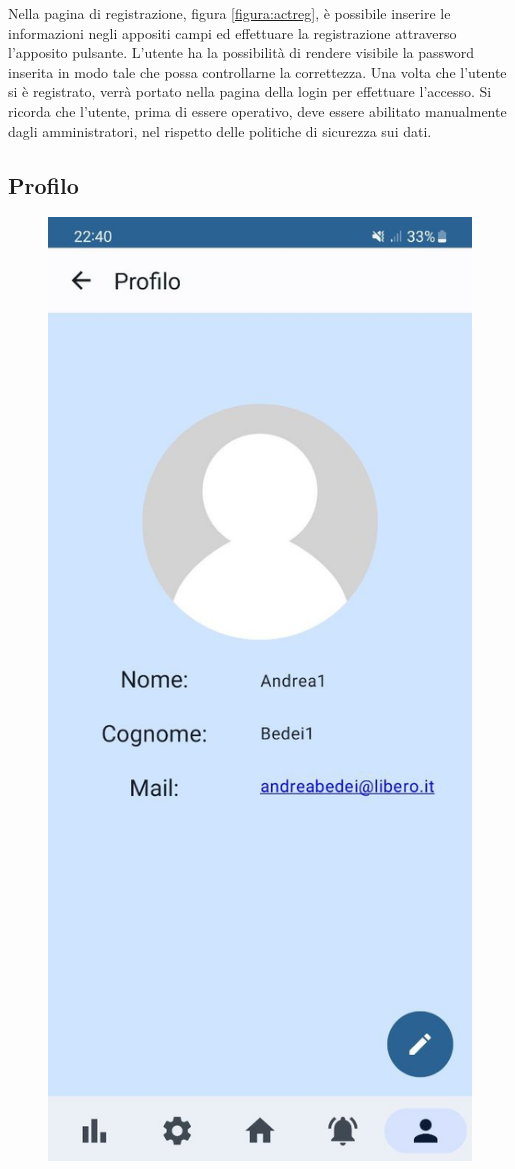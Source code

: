 \documentclass[a4paper,final,12pt]{report}
\begin{document}
Nella pagina di registrazione, figura \ref{figura:actreg}, è possibile inserire le informazioni negli appositi campi ed effettuare la registrazione attraverso l'apposito pulsante. L'utente ha la possibilità di rendere visibile la password inserita in modo tale che possa controllarne la correttezza. Una volta che l'utente si è registrato, verrà portato nella pagina della login per effettuare l'accesso. Si ricorda che l'utente, prima di essere operativo, deve essere abilitato manualmente dagli amministratori, nel rispetto delle politiche di sicurezza sui dati.

\subsection{Profilo}
\begin{figure}[hbtp]
\centering
\includegraphics[scale=0.20]{img_concettuale/prmob.jpg}

\end{figure}
\end{document}
